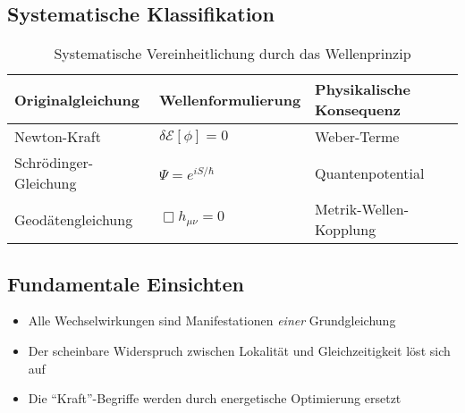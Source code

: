 \subsection{Systematische Klassifikation}
\begin{table}[h]
\centering
\begin{tabular}{p{}p{}p{}}
\toprule
\textbf{Originalgleichung} & \textbf{Wellenformulierung} & \textbf{Physikalische Konsequenz} \\
\midrule
Newton-Kraft & $\delta\mathcal{E}[\phi]=0$ & Weber-Terme \\
Schrödinger-Gleichung & $\Psi=e^{iS/\hbar}$ & Quantenpotential \\
Geodätengleichung & $\Box h_{\mu\nu}=0$ & Metrik-Wellen-Kopplung \\
\bottomrule
\end{tabular}
\caption{Systematische Vereinheitlichung durch das Wellenprinzip}
\end{table}

\subsection{Fundamentale Einsichten}
\begin{itemize}
\item Alle Wechselwirkungen sind Manifestationen \textit{einer} Grundgleichung
\item Der scheinbare Widerspruch zwischen Lokalität und Gleichzeitigkeit löst sich auf
\item Die \enquote{Kraft}-Begriffe werden durch energetische Optimierung ersetzt
\end{itemize}
